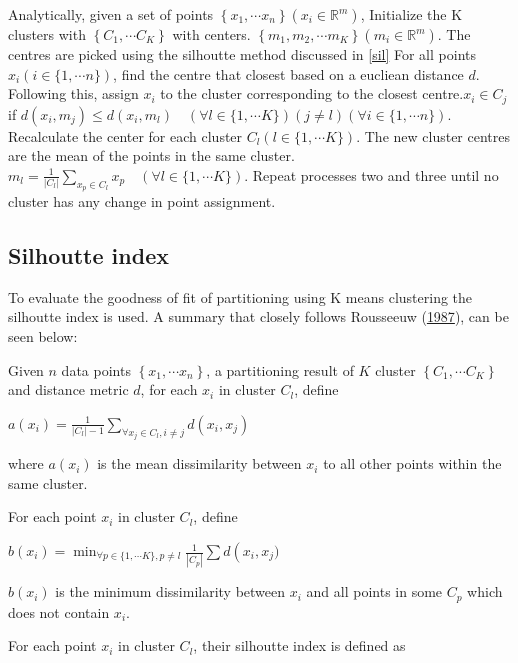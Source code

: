 \documentclass[11pt,preprint, authoryear]{elsarticle}
\numberwithin{equation}{section}
\numberwithin{figure}{section}
\numberwithin{table}{section}
\begin{document}
Analytically, given a set of points
\(\left\{x_1, \cdots x_n\right\}\left(x_i \in \mathbb{R}^m\right)\),
Initialize the K clusters with \(\left\{C_1, \cdots C_K\right\}\) with
centers.
\(\left\{m_1, m_2, \cdots m_K\right\}\left(m_i \in \mathbb{R}^m\right)\).
The centres are picked using the silhoutte method discussed in \ref{sil}
For all points \(x_i(i \in\{1, \cdots n\})\), find the centre that
closest based on a eucliean distance \(d\). Following this, assign
\(x_i\) to the cluster corresponding to the closest
centre.\(x_i \in C_j\) if
\(d\left(x_i, m_j\right) \leq d\left(x_i, m_l\right) \quad(\forall l \in\{1, \cdots K\})(j \neq l)(\forall i \in\{1, \cdots n\})\).
Recalculate the center for each cluster \(C_l(l \in\{1, \cdots K\})\).
The new cluster centres are the mean of the points in the same
cluster.\(m_l=\frac{1}{\left|C_l\right|} \sum_{x_p \in C_l} x_p \quad(\forall l \in\{1, \cdots K\})\).
Repeat processes two and three until no cluster has any change in point
assignment.

\hypertarget{silhoutte-index}{%
\subsection{\texorpdfstring{Silhoutte index
\label{sil}}{Silhoutte index }}\label{silhoutte-index}}

To evaluate the goodness of fit of partitioning using K means clustering
the silhoutte index is used. A summary that closely follows Rousseeuw
(\protect\hyperlink{ref-rousseeuw1987silhouettes}{1987}), can be seen
below:

Given \(n\) data points \(\left\{x_1, \cdots x_n\right\}\), a
partitioning result of \(K\) cluster \(\left\{C_1, \cdots C_K\right\}\)
and distance metric \(d\), for each \(x_i\) in cluster \(C_l\), define

\(a\left(x_i\right)=\frac{1}{\left|C_l\right|-1} \sum_{\forall x_j \in C_l, i \neq j} d\left(x_i, x_j\right)\)

where \(a(x_i)\) is the mean dissimilarity between \(x_i\) to all other
points within the same cluster.

For each point \(x_i\) in cluster \(C_l\), define

\(b\left(x_i\right)=\min _{\forall p \in\{1, \cdots K\}, p \neq l} \frac{1}{\left|C_p\right|} \sum d\left(x_i, x_j\right.)\)

\(b(x_i)\) is the minimum dissimilarity between \(x_i\) and all points
in some \(C_p\) which does not contain \(x_i\).

For each point \(x_i\) in cluster \(C_l\), their silhoutte index is
defined as
\end{document}
